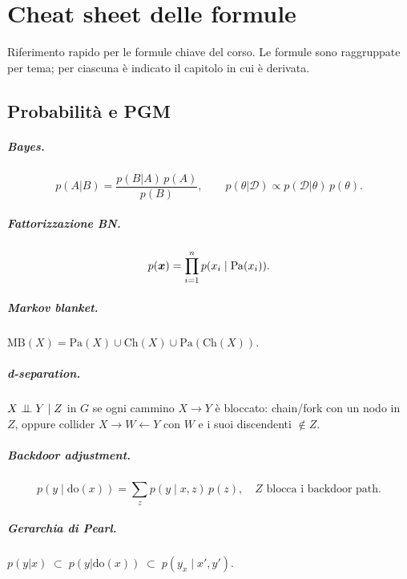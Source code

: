 \chapter{Cheat sheet delle formule}
\label{ch:cheatsheet}

Riferimento rapido per le formule chiave del corso. Le formule sono raggruppate per tema; per ciascuna è indicato il capitolo in cui è derivata.

\section{Probabilità e PGM}

\paragraph{Bayes.}
\[
p(A|B) = \frac{p(B|A)\,p(A)}{p(B)}, \qquad p(\theta|\mathcal{D}) \propto p(\mathcal{D}|\theta)\,p(\theta).
\]

\paragraph{Fattorizzazione BN.}
\[
p(\bm{x}) = \prod_{i=1}^n p(x_i \mid \mathrm{Pa}(x_i)).
\]

\paragraph{Markov blanket.} $\mathrm{MB}(X) = \mathrm{Pa}(X) \cup \mathrm{Ch}(X) \cup \mathrm{Pa}(\mathrm{Ch}(X))$.

\paragraph{d-separation.} $X \perp\!\!\!\perp Y \mid Z$ in $G$ se ogni cammino $X\to Y$ è bloccato: chain/fork con un nodo in $Z$, oppure collider $X\to W \leftarrow Y$ con $W$ e i suoi discendenti $\notin Z$.

\paragraph{Backdoor adjustment.}
\[
p(y \mid \mathrm{do}(x)) = \sum_z p(y \mid x, z)\, p(z), \quad Z \text{ blocca i backdoor path}.
\]

\paragraph{Gerarchia di Pearl.} $p(y|x) \;\subset\; p(y|\mathrm{do}(x)) \;\subset\; p(y_x \mid x',y')$.

